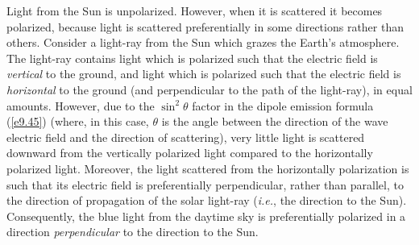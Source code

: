 Light from the Sun is unpolarized. However, when it is scattered it becomes
polarized, because light is scattered preferentially in some directions
rather than others. Consider a light-ray from the Sun which grazes
the Earth's atmosphere. The light-ray contains light which is
polarized such that the electric field is {\em vertical}\/ to the ground, and
light which is polarized such that the electric field is {\em horizontal}\/ to the ground
(and perpendicular to the path of the light-ray), in equal amounts. However,
due to the $\sin^2\theta$ factor in the dipole emission formula
(\ref{e9.45}) (where, in this case, $\theta$ is the angle between the direction of the wave
electric field and the direction of scattering), very little light is scattered downward from the vertically
polarized light compared to the horizontally polarized light. 
Moreover, the light scattered from the horizontally polarization is
such that its electric field is preferentially perpendicular, rather than parallel, to the
direction of propagation of the solar light-ray ({\em i.e.}, the direction to the Sun).
Consequently, the blue light from the daytime sky is preferentially polarized in a direction
{\em perpendicular}\/ to the direction to the Sun.

